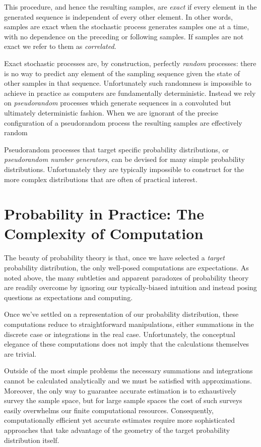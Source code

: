 \documentclass[11pt, oneside]{article}
\begin{document}
This procedure, and hence the resulting samples, are \emph{exact} 
if every element in the generated sequence is independent of every 
other element.  In other words, samples are exact when the stochastic
process generates samples one at a time, with no dependence on the 
preceding or following samples.  If samples are not exact we refer to
them as \emph{correlated}.

Exact stochastic processes are, by construction, perfectly
\emph{random} processes: there is no way to predict any element 
of the sampling sequence given the state of other samples in
that sequence.  Unfortunately such randomness is impossible to 
achieve in practice as computers are fundamentally deterministic.
Instead we rely on \emph{pseudorandom} processes which
generate sequences in a convoluted but ultimately deterministic
fashion.  When we are ignorant of the precise configuration of a
pseudorandom process the resulting samples are effectively
random

Pseudorandom processes that target specific probability distributions, 
or \emph{pseudorandom number generators}, can be devised for 
many simple probability distributions.  Unfortunately they are typically 
impossible to construct for the more complex distributions that are
often of practical interest.

\section{Probability in Practice: The Complexity of Computation}

The beauty of probability theory is that, once we have selected a
\emph{target} probability distribution, the only well-posed computations
are expectations.  As noted above, the many subtleties and apparent 
paradoxes of probability theory are readily overcome by ignoring our
typically-biased intuition and instead posing questions as expectations
and computing.

Once we've settled on a representation of our probability distribution, 
these computations reduce to straightforward manipulations, either 
summations in the discrete case or integrations in the real case.  
Unfortunately, the conceptual elegance of these computations does not 
imply that the calculations themselves are trivial.  

Outside of the most simple problems the necessary summations and 
integrations cannot be calculated analytically and we must be satisfied 
with approximations.  Moreover, the only way to guarantee
accurate estimation is to exhaustively survey the sample space, but
for large sample spaces the cost of such surveys easily overwhelms our 
finite computational resources.  Consequently, computationally efficient 
yet accurate estimates require more sophisticated approaches that take
advantage of the geometry of the target probability distribution itself.
\end{document}
